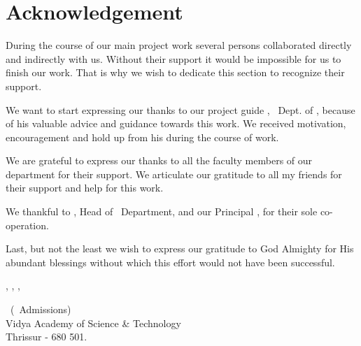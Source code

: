 %
%
%


%
\chapter*{\centering Acknowledgement}
%


\par
\hspace{0.9cm}During the course of our main project work several persons collaborated directly and indirectly with us. Without their support it would be impossible for us to finish our work. That is why we wish to dedicate this section to recognize their support.
\vspace {.2cm}
\par
\hspace{.35cm}We want to start expressing our thanks to our project guide {\bf \vguide}, \vguidedg\ Dept. of \vdept, because of his valuable advice and guidance towards this work. We received motivation, encouragement and hold up from his during the course of work.

\vspace{0.2cm}
\par
\hspace{0.35cm}We are grateful to express our thanks to all the faculty members of our department for their support. We articulate our gratitude to all my friends for their support and help for this work.

\vspace{.2cm}
\par 
\hspace{.35cm}We thankful to {\bf \vhod}, 
Head of \vdept\  Department, and our Principal {\bf \vprincipal}, for their sole co-operation.

\vspace{0.2cm}
\par
\hspace{0.35cm}Last, but not the least we wish to express our gratitude to God Almighty for His abundant blessings without which this effort would not have been successful.\\[.3 cm]



\begin{flushright}
{\vauthora , \vauthorb , \vauthorc , \vauthord }

\vclass\  (\vadmissionyear\  Admissions)\\
Vidya Academy of Science \& Technology\\
\vdate  \hfill Thrissur - 680 501.
\end{flushright}